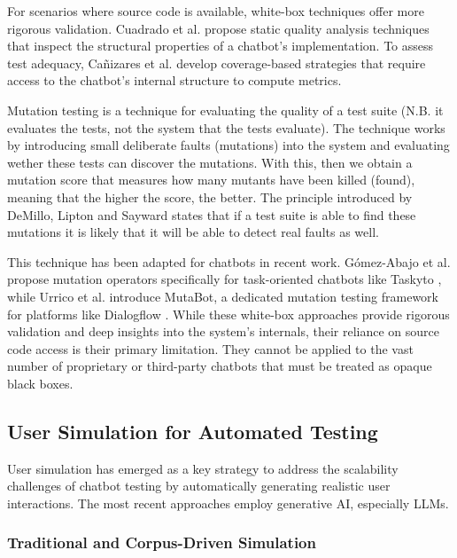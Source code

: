 For scenarios where source code is available,
white-box techniques offer more rigorous validation.
Cuadrado et al. \autocite{cuadradoIntegratingStaticQuality2024}
propose static quality analysis techniques
that inspect the structural properties of a chatbot's implementation.
To assess test adequacy, Cañizares et al.
\autocite{canizaresCoveragebasedStrategiesAutomated2024}
develop coverage-based strategies that
require access to the chatbot's internal structure to compute metrics.

Mutation testing is a technique for evaluating
the quality of a test suite
(N.B. it evaluates the tests, not the system that the tests evaluate).
The technique works by introducing
small deliberate faults (mutations) into the system
and evaluating wether these tests can discover the mutations.
With this, then we obtain a mutation score
that measures how many mutants have been killed (found),
meaning that the higher the score, the better.
The principle introduced by DeMillo, Lipton and Sayward
\autocite{demilloHintsTestData1978}
states that if a test suite is able to find these mutations
it is likely that it will be able to detect real faults as well.

This technique has been adapted for chatbots in recent work.
Gómez-Abajo et al. \autocite{gomez-abajoMutationTestingTaskOriented2024}
propose mutation operators specifically for task-oriented chatbots like Taskyto \autocite{sanchezcuadradoAutomatingDevelopmentTaskoriented2024},
while Urrico et al. \autocite{urricoMutaBotMutationTesting2024} introduce MutaBot,
a dedicated mutation testing framework for platforms like Dialogflow \autocite{Dialogflow}.
While these white-box approaches provide rigorous validation
and deep insights into the system's internals,
their reliance on source code access
is their primary limitation.
They cannot be applied to the vast number of
proprietary or third-party chatbots
that must be treated as opaque black boxes.

\subsection{User Simulation for Automated Testing}

User simulation has emerged as a key strategy to
address the scalability challenges of chatbot testing
by automatically generating realistic user interactions.
The most recent approaches employ generative \acl{AI},
especially \acp {LLM}.

\subsubsection{Traditional and Corpus-Driven Simulation}

